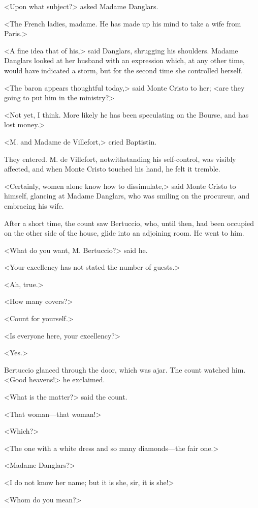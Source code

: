  <Upon what subject?> asked Madame Danglars. 

 <The French ladies, madame. He has made up his mind to take a wife from Paris.> 

 <A fine idea that of his,> said Danglars, shrugging his shoulders. Madame Danglars looked at her husband with an expression which, at any other time, would have indicated a storm, but for the second time she controlled herself. 

 <The baron appears thoughtful today,> said Monte Cristo to her; <are they going to put him in the ministry?> 

 <Not yet, I think. More likely he has been speculating on the Bourse, and has lost money.> 

 <M. and Madame de Villefort,> cried Baptistin. 

 They entered. M. de Villefort, notwithstanding his self-control, was visibly affected, and when Monte Cristo touched his hand, he felt it tremble. 

 <Certainly, women alone know how to dissimulate,> said Monte Cristo to himself, glancing at Madame Danglars, who was smiling on the procureur, and embracing his wife. 

 After a short time, the count saw Bertuccio, who, until then, had been occupied on the other side of the house, glide into an adjoining room. He went to him. 

 <What do you want, M. Bertuccio?> said he. 

 <Your excellency has not stated the number of guests.> 

 <Ah, true.> 

 <How many covers?> 

 <Count for yourself.> 

 <Is everyone here, your excellency?> 

 <Yes.> 

 Bertuccio glanced through the door, which was ajar. The count watched him. <Good heavens!> he exclaimed. 

 <What is the matter?> said the count. 

 <That woman—that woman!> 

 <Which?> 

 <The one with a white dress and so many diamonds—the fair one.> 

 <Madame Danglars?> 

 <I do not know her name; but it is she, sir, it is she!> 

 <Whom do you mean?> 

